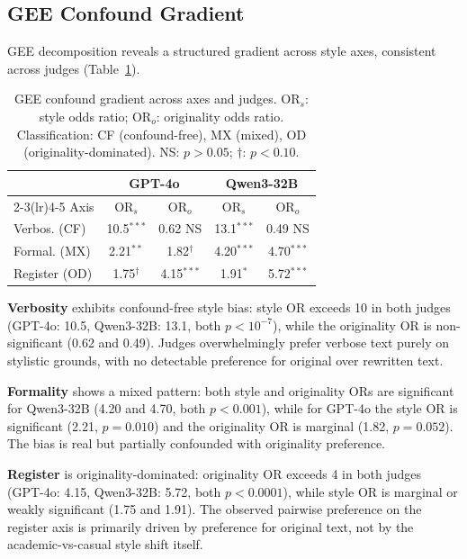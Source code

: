 \documentclass[10pt,twocolumn]{article}
\begin{document}
\subsection{GEE Confound Gradient}\label{sec:gradient}

GEE decomposition reveals a structured gradient across style axes, consistent across judges (Table~\ref{tab:gee}).

\begin{table}[t]
\centering
\caption{GEE confound gradient across axes and judges. OR$_s$: style odds ratio; OR$_o$: originality odds ratio. Classification: CF (confound-free), MX (mixed), OD (originality-dominated). NS: $p>0.05$; $\dagger$: $p<0.10$.}
\label{tab:gee}
\small
\begin{tabular}{@{}lcccc@{}}
\toprule
& \multicolumn{2}{c}{GPT-4o} & \multicolumn{2}{c}{Qwen3-32B} \\
\cmidrule(lr){2-3}\cmidrule(lr){4-5}
Axis & OR$_s$ & OR$_o$ & OR$_s$ & OR$_o$ \\
\midrule
Verbos. (CF) & 10.5$^{***}$ & 0.62\tiny{ NS} & 13.1$^{***}$ & 0.49\tiny{ NS} \\
Formal. (MX) & 2.21$^{**}$ & 1.82$^{\dagger}$ & 4.20$^{***}$ & 4.70$^{***}$ \\
Register (OD) & 1.75$^{\dagger}$ & 4.15$^{***}$ & 1.91$^{*}$ & 5.72$^{***}$ \\
\bottomrule
\end{tabular}
\end{table}

\textbf{Verbosity} exhibits confound-free style bias: style OR exceeds 10 in both judges (GPT-4o: 10.5, Qwen3-32B: 13.1, both $p<10^{-7}$), while the originality OR is non-significant (0.62 and 0.49).
Judges overwhelmingly prefer verbose text purely on stylistic grounds, with no detectable preference for original over rewritten text.

\textbf{Formality} shows a mixed pattern: both style and originality ORs are significant for Qwen3-32B (4.20 and 4.70, both $p<0.001$), while for GPT-4o the style OR is significant (2.21, $p=0.010$) and the originality OR is marginal (1.82, $p=0.052$).
The bias is real but partially confounded with originality preference.

\textbf{Register} is originality-dominated: originality OR exceeds 4 in both judges (GPT-4o: 4.15, Qwen3-32B: 5.72, both $p<0.0001$), while style OR is marginal or weakly significant (1.75 and 1.91).
The observed pairwise preference on the register axis is primarily driven by preference for original text, not by the academic-vs-casual style shift itself.
\end{document}
